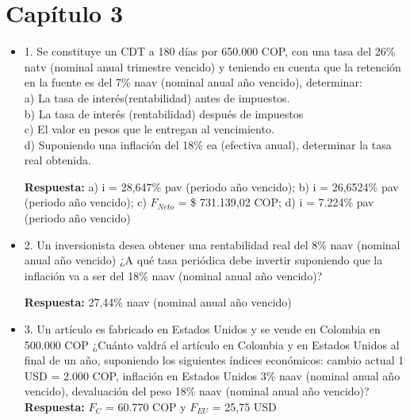 \chapter*{Capítulo 3}



\begin{itemize}

 \item 1. Se  constituye  un  CDT  a  180  días  por 650.000 COP,  con  una  tasa  del  26\% natv (nominal anual trimestre vencido) y teniendo  en  cuenta  que  la retención en la fuente es del 7\% naav (nominal anual año vencido), determinar:\\

       a) La tasa de interés(rentabilidad) antes de impuestos.\\
       b) La tasa de interés (rentabilidad) después de impuestos\\
       c) El valor en pesos que le entregan al vencimiento.\\
       d) Suponiendo una inflación del 18\% ea (efectiva anual), determinar la tasa real obtenida.
       
       \textbf{Respuesta:} a) i = 28,647\% pav (periodo año vencido); b) i = 26,6524\% pav (periodo año vencido); c) $F_{Neto}$ = \$ 731.139,02 COP; d) i = 7.224\% pav (periodo año vencido)\\
       \medskip

 \item 2. Un inversionista desea  obtener  una  rentabilidad  real  del  8\%  naav (nominal anual año vencido) ¿A qué tasa periódica debe invertir suponiendo que la inflación va a ser del 18\% naav (nominal anual año vencido)?

       \textbf{Respuesta:} 27,44\% naav (nominal anual año vencido)\\
       \medskip

 \item 3. Un  artículo  es  fabricado  en  Estados  Unidos  y  se  vende  en  Colombia  en 500.000 COP ¿Cuánto  valdrá  el  artículo  en  Colombia  y  en  Estados  Unidos  al final  de  un  año,  suponiendo  los  siguientes  índices  económicos: cambio actual 1 USD =  2.000 COP, inflación en Estados Unidos 3\% naav (nominal anual año vencido), devaluación del peso 18\% naav (nominal anual año vencido)?\\
       \textbf{Respuesta:} $F_{C}$ =  60.770 COP y $F_{EU}$ =  25,75 USD\\
       \medskip


\end{itemize}
